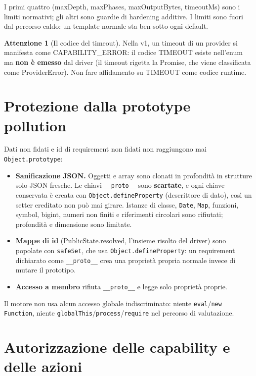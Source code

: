 \documentclass[11pt,a4paper]{book}
\let\code\lstinline
\newcommand{\ic}[1]{{\ttfamily #1}}
\theoremstyle{definition}
\newtheorem*{attenzione}{Attenzione}
\begin{document}
{{{{I primi quattro (\ic{maxDepth}, \ic{maxPhases}, \ic{maxOutputBytes},
\ic{timeoutMs}) sono i limiti normativi; gli altri sono guardie di hardening
additive. I limiti sono fuori dal percorso caldo: un template normale sta ben sotto
ogni default.

\begin{attenzione}[Il codice del timeout]
Nella v1, un timeout di un provider si manifesta come \ic{CAPABILITY\_ERROR}: il
codice \ic{TIMEOUT} esiste nell'enum ma \textbf{non è emesso} dal driver (il timeout
rigetta la Promise, che viene classificata come \ic{ProviderError}). Non fare
affidamento su \ic{TIMEOUT} come codice runtime.
\end{attenzione}

\section{Protezione dalla prototype pollution}

Dati non fidati e id di requirement non fidati non raggiungono mai
\code|Object.prototype|:

\begin{itemize}
  \item \textbf{Sanificazione JSON.} Oggetti e array sono clonati in profondità in
    strutture solo-JSON fresche. Le chiavi \code|__proto__| sono \textbf{scartate}, e
    ogni chiave conservata è creata con \code|Object.defineProperty| (descrittore di
    dato), così un setter ereditato non può mai girare. Istanze di classe,
    \code|Date|, \code|Map|, funzioni, symbol, bigint, numeri non finiti e
    riferimenti circolari sono rifiutati; profondità e dimensione sono limitate.
  \item \textbf{Mappe di id} (\ic{PublicState.resolved}, l'insieme risolto del
    driver) sono popolate con \code|safeSet|, che usa \code|Object.defineProperty|:
    un requirement dichiarato come \code|__proto__| crea una proprietà propria
    normale invece di mutare il prototipo.
  \item \textbf{Accesso a membro} rifiuta \code|__proto__| e legge solo proprietà
    proprie.
\end{itemize}

Il motore non usa alcun accesso globale indiscriminato: niente \code|eval|/\code|new Function|,
niente \code|globalThis|/\code|process|/\code|require| nel percorso di valutazione.

\section{Autorizzazione delle capability e delle azioni}

}}}}
\end{document}
